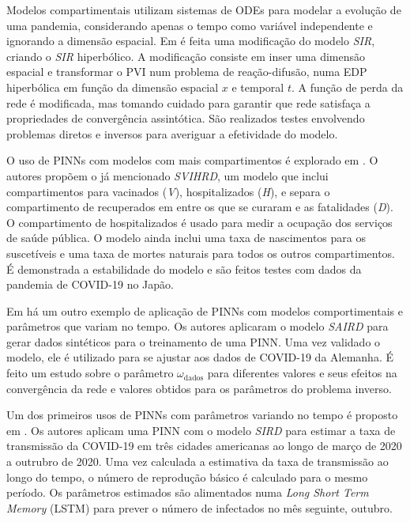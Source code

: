 Modelos compartimentais utilizam sistemas de ODEs para modelar a evolução
de uma pandemia, considerando apenas o tempo como variável independente e 
ignorando a dimensão espacial.
Em \cite{bertaglia-etal:22-sir-reacao-difusao} é feita uma modificação do 
modelo \textit{SIR}, criando o \textit{SIR} hiperbólico. 
A modificação consiste em inser uma dimensão espacial e transformar o PVI
num problema de reação-difusão, numa EDP hiperbólica em função da dimensão espacial $x$
e temporal $t$. A função de perda da rede é modificada, mas tomando cuidado
para garantir que rede satisfaça a propriedades de convergência assintótica.
São realizados testes envolvendo problemas diretos e inversos para averiguar
a efetividade do modelo.

O uso de PINNs com modelos com mais compartimentos é explorado em \cite{nelson-etal:24-japao}.
O autores propõem o já mencionado \textit{SVIHRD}, um modelo que inclui 
compartimentos para vacinados (\textit{V}), hospitalizados (\textit{H}), 
e separa o compartimento de recuperados em entre os que se curaram e as 
fatalidades (\textit{D}).
O compartimento de hospitalizados é usado para medir a ocupação dos serviços de
saúde pública.
O modelo ainda inclui uma taxa de nascimentos para os 
suscetíveis e uma taxa de mortes naturais para todos os outros compartimentos.
É demonstrada a estabilidade do modelo e são feitos testes com dados da pandemia 
de COVID-19 no Japão.

Em \cite{han-etal:24-prim-artigo-alemanha} há um outro exemplo de aplicação de
PINNs com modelos comportimentais e parâmetros que variam no tempo. Os autores
aplicaram o modelo \textit{SAIRD} para gerar dados sintéticos para 
o treinamento de uma PINN. Uma vez validado o modelo, ele é utilizado para se
ajustar aos dados de COVID-19 da Alemanha. É feito um estudo sobre o
parâmetro $\omega_{\text{dados}}$ para diferentes valores e seus efeitos na 
convergência da rede e valores obtidos para os parâmetros do problema inverso. 

Um dos primeiros usos de PINNs com parâmetros variando no tempo é proposto em 
\cite{long-etal:21-L2}. Os autores aplicam uma PINN com o modelo \textit{SIRD}
para estimar a taxa de transmissão da COVID-19 em três cidades americanas
ao longo de março de 2020 a outrubro de 2020. Uma vez calculada a estimativa da 
taxa de transmissão ao longo do tempo, o número de reprodução básico é calculado
para o mesmo período. 
Os parâmetros estimados são alimentados numa \textit{Long Short Term Memory} 
(LSTM) para prever o número de infectados no mês seguinte, outubro. 


